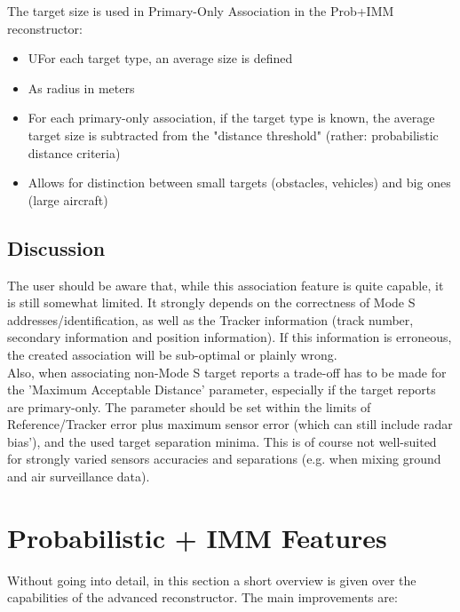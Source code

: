 \begin{itemize}
The target size is used in Primary-Only Association in the Prob+IMM reconstructor:

\begin{itemize}
\item UFor each target type, an average size is defined
\item As radius in meters
\item For each primary-only association, if the target type is known, the average target size is subtracted from the "distance threshold" (rather: probabilistic distance criteria)
\item Allows for distinction between small targets (obstacles, vehicles) and big ones (large aircraft)
\end{itemize}

\subsection{Discussion}

The user should be aware that, while this association feature is quite capable, it is still somewhat limited. 
It strongly depends on the correctness of Mode S addresses/identification, as well as the Tracker information (track number, secondary information and position information). 
If this information is erroneous, the created association will be sub-optimal or plainly wrong. \\

Also, when associating non-Mode S target reports a trade-off has to be made for the 'Maximum Acceptable Distance' parameter, 
especially if the target reports are primary-only. The parameter should be set within the limits of Reference/Tracker error plus maximum sensor error (which can still include radar bias'), and the used target separation minima. 
This is of course not well-suited for strongly varied sensors accuracies and separations (e.g. when mixing ground and air surveillance data). \\

\section{Probabilistic + IMM Features}

Without going into detail, in this section a short overview is given over the capabilities of the advanced reconstructor. The main improvements are:


\end{itemize}
